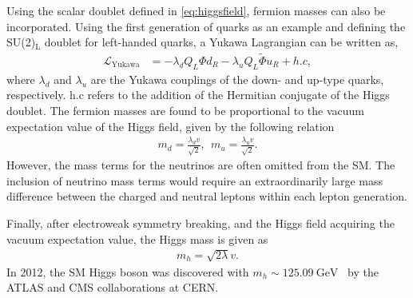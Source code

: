 Using the scalar doublet defined in \cref{eq:higgsfield}, fermion masses can also be incorporated. Using the first generation of quarks as an example and defining the SU(2)$_\mathrm{L}$ doublet for left-handed quarks, a Yukawa Lagrangian can be written as, 
\begin{equation}
    \label{eq:YukawaLagrangian}
    \begin{aligned}
        \mathcal{L}_\mathrm{Yukawa} &= -\lambda_d Q_L \Phi d_R - \lambda_u Q_L \tilde{\Phi}u_R + h.c,
     \end{aligned}
\end{equation}
where $\lambda_{d}$ and $\lambda_u$ are the Yukawa couplings of the down- and up-type quarks, respectively. h.c refers to the addition of the Hermitian conjugate of the Higgs doublet. The fermion masses are found to be proportional to the vacuum expectation value of the Higgs field, given by the following relation
\begin{equation}
    \label{eq:fermionmass}
    \begin{aligned}
        m_d = \frac{\lambda_d v}{\sqrt{2}},~~m_u = \frac{\lambda_u v}{\sqrt{2}}.
     \end{aligned}
\end{equation}
However, the mass terms for the neutrinos are often omitted from the SM. The inclusion of neutrino mass terms would require an extraordinarily large mass difference between the charged and neutral leptons within each lepton generation. 

Finally, after electroweak symmetry breaking, and the Higgs field acquiring the vacuum expectation value, the Higgs mass is given as
\begin{equation}
    \label{eq:higgsmass}
    \begin{aligned}
        m_h = \sqrt{2\lambda}v.
     \end{aligned}
\end{equation}
In 2012, the SM Higgs boson was discovered with $m_h \sim \SI{125.09}{\giga\electronvolt}$~\cite{Aad_2012,Chatrchyan2012} by the ATLAS and CMS collaborations at CERN. 

